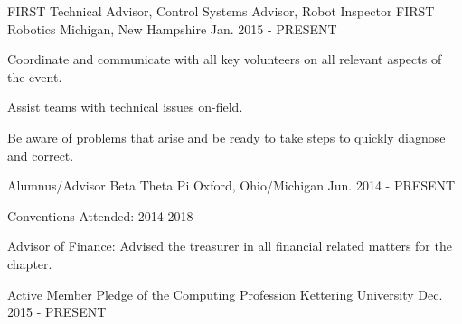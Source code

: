 
\begin{cventries}

  \cventry
    {FIRST Technical Advisor, Control Systems Advisor, Robot Inspector} %
    {FIRST Robotics} %
    {Michigan, New Hampshire} %
    {Jan. 2015 - PRESENT} %
    {
      \begin{cvitems} %
        \item {Coordinate and communicate with all key volunteers on all relevant aspects of the event.}
        \item {Assist teams with technical issues on-field.}
        \item {Be aware of problems that arise and be ready to take steps to quickly diagnose and correct.}
      \end{cvitems}
    }

  \cventry
    {Alumnus/Advisor} %
    {Beta Theta Pi} %
    {Oxford, Ohio/Michigan} %
    {Jun. 2014 - PRESENT} %
    {
      \begin{cvitems} %
        \item {Conventions Attended: 2014-2018}
        \item {Advisor of Finance: Advised the treasurer in all financial related matters for the chapter.}
      \end{cvitems}
    }

  \cventry
    {Active Member} %
    {Pledge of the Computing Profession} %
    {Kettering University} %
    {Dec. 2015 - PRESENT} %
    {
      \begin{cvitems} %
      \end{cvitems}
    }

\end{cventries}
